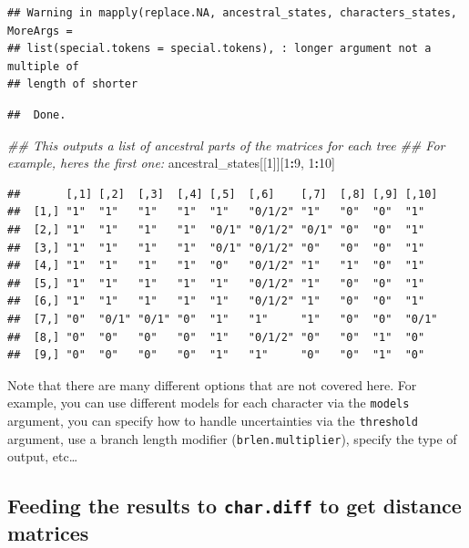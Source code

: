 \documentclass[
]{book}
\newenvironment{Shaded}{\begin{snugshade}}{\end{snugshade}}
\newcommand{\CommentTok}[1]{\textcolor[rgb]{0.56,0.35,0.01}{\textit{#1}}}
\newcommand{\DecValTok}[1]{\textcolor[rgb]{0.00,0.00,0.81}{#1}}
\newcommand{\NormalTok}[1]{#1}
\newcommand{\OperatorTok}[1]{\textcolor[rgb]{0.81,0.36,0.00}{\textbf{#1}}}
\begin{document}
\begin{verbatim}
## Warning in mapply(replace.NA, ancestral_states, characters_states, MoreArgs =
## list(special.tokens = special.tokens), : longer argument not a multiple of
## length of shorter
\end{verbatim}

\begin{verbatim}
##  Done.
\end{verbatim}

\begin{Shaded}
\begin{Highlighting}[]
\CommentTok{\#\# This outputs a list of ancestral parts of the matrices for each tree}
\CommentTok{\#\# For example, here\textquotesingle{}s the first one:}
\NormalTok{ancestral\_states[[}\DecValTok{1}\NormalTok{]][}\DecValTok{1}\OperatorTok{:}\DecValTok{9}\NormalTok{, }\DecValTok{1}\OperatorTok{:}\DecValTok{10}\NormalTok{]}
\end{Highlighting}
\end{Shaded}

\begin{verbatim}
##       [,1] [,2]  [,3]  [,4] [,5]  [,6]    [,7]  [,8] [,9] [,10]
##  [1,] "1"  "1"   "1"   "1"  "1"   "0/1/2" "1"   "0"  "0"  "1"  
##  [2,] "1"  "1"   "1"   "1"  "0/1" "0/1/2" "0/1" "0"  "0"  "1"  
##  [3,] "1"  "1"   "1"   "1"  "0/1" "0/1/2" "0"   "0"  "0"  "1"  
##  [4,] "1"  "1"   "1"   "1"  "0"   "0/1/2" "1"   "1"  "0"  "1"  
##  [5,] "1"  "1"   "1"   "1"  "1"   "0/1/2" "1"   "0"  "0"  "1"  
##  [6,] "1"  "1"   "1"   "1"  "1"   "0/1/2" "1"   "0"  "0"  "1"  
##  [7,] "0"  "0/1" "0/1" "0"  "1"   "1"     "1"   "0"  "0"  "0/1"
##  [8,] "0"  "0"   "0"   "0"  "1"   "0/1/2" "0"   "0"  "1"  "0"  
##  [9,] "0"  "0"   "0"   "0"  "1"   "1"     "0"   "0"  "1"  "0"
\end{verbatim}

Note that there are many different options that are not covered here.
For example, you can use different models for each character via the \texttt{models} argument, you can specify how to handle uncertainties via the \texttt{threshold} argument, use a branch length modifier (\texttt{brlen.multiplier}), specify the type of output, etc\ldots{}

\hypertarget{feeding-the-results-to-char.diff-to-get-distance-matrices}{%
\subsection{\texorpdfstring{Feeding the results to \texttt{char.diff} to get distance matrices}{Feeding the results to char.diff to get distance matrices}}\label{feeding-the-results-to-char.diff-to-get-distance-matrices}}
\end{document}

